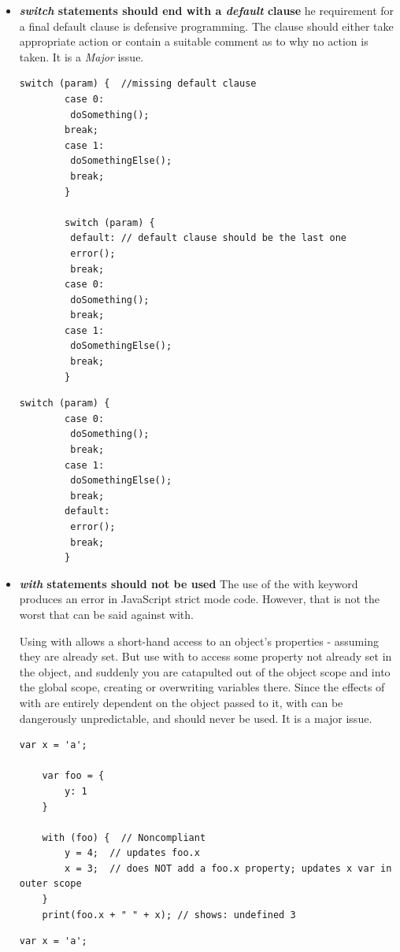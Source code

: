 \begin{itemize}
	
	\item \textbf{ \textit{switch} statements should end with a \textit{default} clause}
	he requirement for a final default clause is defensive programming. The clause should either take appropriate action or contain a suitable comment as to why no action is taken. It is a \textit{Major} issue.
	

		
		\begin{lstlisting}[caption=Noncompliant Code Example]
		switch (param) {  //missing default clause
		case 0:
		 doSomething();
		break;
		case 1:
		 doSomethingElse();
		 break;
		}
		
		switch (param) {
		 default: // default clause should be the last one
		 error();
		 break;
		case 0:
		 doSomething();
		 break;
		case 1:
		 doSomethingElse();
		 break;
		}
		\end{lstlisting}
		
		\begin{lstlisting}[caption=Compliant Solution]
		switch (param) {
		case 0:
		 doSomething();
		 break;
		case 1:
		 doSomethingElse();
		 break;
		default:
		 error();
		 break;
		}
		\end{lstlisting}	
	
	
	\item \textbf{\textit{with} statements should not be used}
	The use of the with keyword produces an error in JavaScript strict mode code. However, that is not the worst that can be said against with.
	
	Using with allows a short-hand access to an object's properties - assuming they are already set. But use with to access some property not already set in the object, and suddenly you are catapulted out of the object scope and into the global scope, creating or overwriting variables there. Since the effects of with are entirely dependent on the object passed to it, with can be dangerously unpredictable, and should never be used. It is a major issue.
	
		\begin{lstlisting}[caption=Noncompliant Code Example]
	var x = 'a';
	
	var foo = {
		y: 1
	}
	
	with (foo) {  // Noncompliant
		y = 4;  // updates foo.x
		x = 3;  // does NOT add a foo.x property; updates x var in outer scope
	}
	print(foo.x + " " + x); // shows: undefined 3
		\end{lstlisting}
		
			\begin{lstlisting}[caption=Compliant Solution]
			var x = 'a';
			

\end{lstlisting}
\end{itemize}
